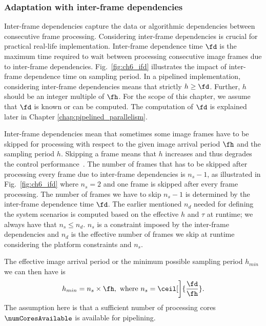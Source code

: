 \subsubsection{Adaptation with inter-frame dependencies}
\label{sec:ch6_ifd}
Inter-frame dependencies capture the data or algorithmic dependencies between consecutive frame processing.
Considering inter-frame dependencies is crucial for practical real-life implementation. 
Inter-frame dependence time $\fd$ is the maximum time required to wait between processing consecutive image frames due to inter-frame dependencies. 
Fig.~\ref{fig:ch6_ifd} illustrates the impact of inter-frame dependence time on sampling period.
In a pipelined implementation, considering inter-frame dependencies means that strictly $h\ge \fd$.
Further, $h$ should be an integer multiple of $\fh$.
For the scope of this chapter, we assume that $\fd$ is known or can be computed.
The computation of $\fd$ is explained later in Chapter \ref{chap:pipelined_parallelism}.

Inter-frame dependencies mean that sometimes some image frames have to be skipped for processing with respect to the given image arrival period $\fh$ and the sampling period $h$.
Skipping a frame means that $h$ increases and thus degrades the control performance~\cite{medina2019designing}.
The number of frames that has to be skipped after processing every frame due to inter-frame dependencies is $n_s-1$, as illustrated in Fig.~\ref{fig:ch6_ifd} where $n_s=2$ and one frame is skipped after every frame processing.
The number of frames we have to skip $n_s-1$ is determined by the inter-frame dependence time $\fd$. The earlier mentioned $n_d$ needed for defining the system scenarios is computed based on the effective $h$ and $\tau$ at runtime; we always have that $n_s\le n_d$.
$n_s$ is a constraint imposed by the inter-frame dependencies and $n_d$ is the effective number of frames we skip at runtime considering the platform constraints and $n_s$.

The effective image arrival period or the minimum possible sampling period $h_{min}$ we can then have is
\begin{equation}
    h_{min}= n_s \times \fh,\text{ where }n_s=\ceil[\bigg]{\frac{\fd}{\fh}}. \nonumber
\end{equation}
The assumption here is that a sufficient number of processing cores $\numCoresAvailable$ is available for pipelining.

